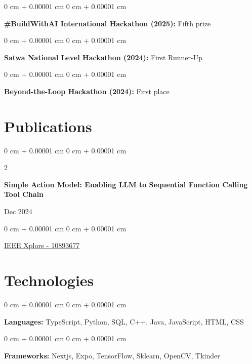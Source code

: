 \documentclass[10pt, letterpaper]{article}
\newenvironment{onecolentry}{
    \begin{adjustwidth}{
        0 cm + 0.00001 cm
    }{
        0 cm + 0.00001 cm
    }
}{
    \end{adjustwidth}
} %
\newenvironment{twocolentry}[2][]{
    \onecolentry
    \def\secondColumn{#2}
    \setcolumnwidth{\fill, 4.5 cm}
    \begin{paracol}{2}
}{
    \switchcolumn \raggedleft \secondColumn
    \end{paracol}
    \endonecolentry
} %
\begin{document}
\vspace{0.2 cm}
\begin{onecolentry}
	\textbf{\#BuildWithAI International Hackathon (2025):} Fifth prize
\end{onecolentry}

\vspace{0.2 cm}
\begin{onecolentry}
	\textbf{Satwa National Level Hackathon (2024):} First Runner-Up
\end{onecolentry}

\vspace{0.2 cm}

\begin{onecolentry}
	\textbf{Beyond-the-Loop Hackathon (2024):} First place
\end{onecolentry}

\section{Publications}

\begin{samepage}
	\begin{twocolentry}{
			Dec 2024
		}
		\textbf{Simple Action Model: Enabling LLM to Sequential Function Calling Tool Chain}
	\end{twocolentry}

	\vspace{0.10 cm}

	\begin{onecolentry}

		\vspace{0.10 cm}

		\href{https://ieeexplore.ieee.org/document/10893677}{IEEE Xplore - 10893677}
	\end{onecolentry}
\end{samepage}

\section{Technologies}

\begin{onecolentry}
	\textbf{Languages:} TypeScript, Python, SQL, C++, Java, JavaScript, HTML, CSS
\end{onecolentry}

\vspace{0.2 cm}

\begin{onecolentry}
	\textbf{Frameworks:} Nextjs, Expo, TensorFlow, Sklearn, OpenCV, Tkinder
\end{onecolentry}
\vspace{0.2 cm}
\end{document}
